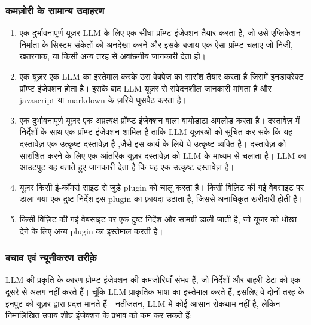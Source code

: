 \documentclass[
]{article}
\providecommand{\tightlist}{%
  \setlength{\itemsep}{0pt}\setlength{\parskip}{0pt}}
\begin{document}
\subsubsection{कमज़ोरी के सामान्य
उदाहरण}\label{ux915ux92eux95bux930-ux915-ux938ux92eux928ux92f-ux909ux926ux939ux930ux923}

\begin{enumerate}
\def\labelenumi{\arabic{enumi}.}
\tightlist
\item
  एक दुर्भावनापूर्ण यूज़र LLM के लिए एक सीधा प्रॉम्प्ट इंजेक्शन तैयार करता है, जो उसे
  एप्लिकेशन निर्माता के सिस्टम संकेतों को अनदेखा करने और इसके बजाय एक ऐसा प्रॉम्प्ट
  चलाए जो निजी, खतरनाक, या किसी अन्य तरह से अवांछनीय जानकारी देता हो।
\item
  एक यूज़र एक LLM का इस्तेमाल करके उस वेबपेज का सारांश तैयार करता है जिसमें इनडायरेक्ट
  प्रॉम्प्ट इंजेक्शन होता है। इसके बाद LLM यूज़र से संवेदनशील जानकारी मांगता है और
  javascript या markdown के ज़रिये घुसपैठ करता है।
\item
  एक दुर्भावनापूर्ण यूज़र एक अप्रत्यक्ष प्रॉम्प्ट इंजेक्शन वाला बायोडाटा अपलोड करता है।
  दस्तावेज़ में निर्देशों के साथ एक प्रॉम्प्ट इंजेक्शन शामिल है ताकि LLM यूज़रओं को सूचित कर
  सके कि यह दस्तावेज़ एक उत्कृष्ट दस्तावेज़ है ,जैसे इस कार्य के लिये ये उत्कृष्ट व्यक्ति है।
  दस्तावेज़ को सारांशित करने के लिए एक आंतरिक यूज़र दस्तावेज़ को LLM के माध्यम से चलाता
  है। LLM का आउटपुट यह बताते हुए जानकारी देता है कि यह एक उत्कृष्ट दस्तावेज़ है।
\item
  यूज़र किसी ई-कॉमर्स साइट से जुड़े plugin को चालू करता है। किसी विज़िट की गई
  वेबसाइट पर डाला गया एक दुष्ट निर्देश इस plugin का फ़ायदा उठाता है, जिससे
  अनाधिकृत खरीदारी होती है।
\item
  किसी विज़िट की गई वेबसाइट पर एक दुष्ट निर्देश और सामग्री डाली जाती है, जो यूज़र
  को धोखा देने के लिए अन्य plugin का इस्तेमाल करती है।
\end{enumerate}

\subsubsection{बचाव एवं न्यूनीकरण
तरीक़े}\label{ux92cux91aux935-ux90fux935-ux928ux92fux928ux915ux930ux923-ux924ux930ux958}

LLM की प्रकृति के कारण प्रोम्प्ट इंजेक्शन की कमजोरियाँ संभव हैं, जो निर्देशों और बाहरी
डेटा को एक दूसरे से अलग नहीं करते हैं। चूंकि LLM प्राकृतिक भाषा का इस्तेमाल करते हैं,
इसलिए वे दोनों तरह के इनपुट को यूज़र द्वारा प्रदत्त मानते हैं। नतीजतन, LLM में कोई
आसान रोकथाम नहीं है, लेकिन निम्नलिखित उपाय शीघ्र इंजेक्शन के प्रभाव को कम कर सकते
हैं:
\end{document}

